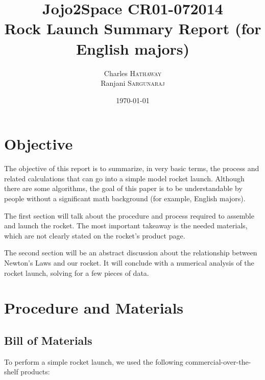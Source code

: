 \documentclass{article}
\title{Jojo2Space CR01-072014\\Rock Launch Summary Report (for English majors)} %
\author{Charles \textsc{Hathaway} \\Ranjani \textsc{Sargunaraj}} %
\date{\today} %
\begin{document}
\maketitle %



\section{Objective}

The objective of this report is to summarize, in very basic terms, the process and related calculations that can go into a simple model rocket launch.
Although there are some algorithms, the goal of this paper is to be understandable by people without a significant math background (for example, English majors).

The first section will talk about the procedure and process required to assemble and launch the rocket.
The most important takeaway is the needed materials, which are not clearly stated on the rocket's product page.

The second section will be an abstract discussion about the relationship between Newton's Laws and our rocket.
It will conclude with a numerical analysis of the rocket launch, solving for a few pieces of data.
 
\section{Procedure and Materials}

\subsection{Bill of Materials}

To perform a simple rocket launch, we used the following commercial-over-the-shelf products:
\end{document}
